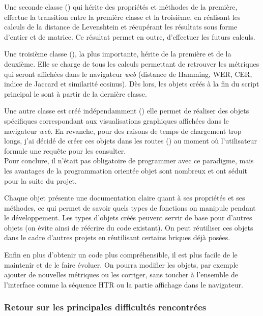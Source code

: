 Une seconde classe () qui hérite des propriétés et méthodes de la première, effectue la transition entre la première classe et la troisième, en réalisant les calculs de la distance de Levenshtein et récupérant les résultats sous forme d'entier et de matrice. Ce résultat permet en outre, d'effectuer les futurs calculs.

Une troisième classe (), la plus importante, hérite de la première et de la deuxième. Elle se charge de tous les calculs permettant de retrouver les métriques qui seront affichées dans le navigateur \textit{web} (distance de Hamming, WER, CER, indice de Jaccard et similarité cosinus). Dès lors, les objets créés à la fin du script principal  le sont à partir de la dernière classe. 

Une autre classe est créé indépendamment () elle permet de réaliser des objets spécifiques correspondant aux visualisations graphiques affichées dans le navigateur \textit{web}. En revanche, pour des raisons de temps de chargement trop longs, j'ai décidé de créer ces objets dans les routes () au moment où l'utilisateur formule une requête pour les consulter.\\

Pour conclure, il n'était pas obligatoire de programmer avec ce paradigme, mais les avantages de la programmation orientée objet sont nombreux et ont séduit pour la suite du projet. 

Chaque objet présente une documentation claire quant à ses propriétés et ses méthodes, ce qui permet de savoir quels types de fonctions on manipule pendant le développement. Les types d'objets créés peuvent servir de base pour d'autres objets (on évite ainsi de réécrire du code existant). On peut réutiliser ces objets dans le cadre d'autres projets en réutilisant certains briques déjà posées. 

Enfin en plus d'obtenir un code plus compréhensible, il est plus facile de le maintenir et de le faire évoluer. On pourra modifier les objets, par exemple ajouter de nouvelles métriques ou les corriger, sans toucher à l'ensemble de l'interface comme la séquence HTR ou la partie affichage dans le navigateur.

\subsubsection{Retour sur les principales difficultés rencontrées}


